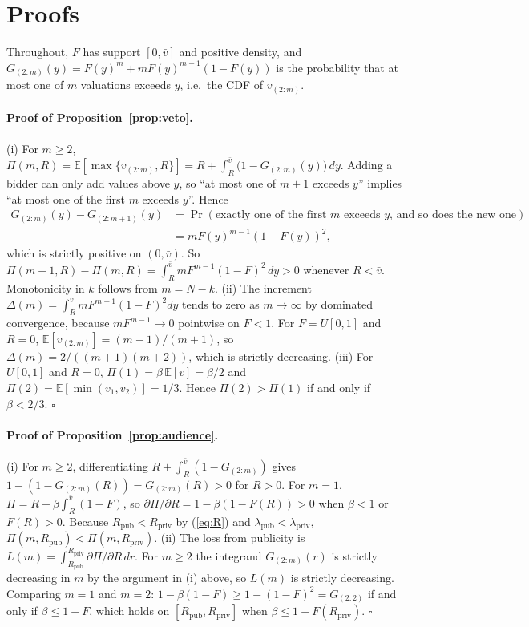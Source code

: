 \appendix
\section{Proofs}\label{app:proofs}

Throughout, $F$ has support $[0,\bar v]$ and positive density, and $G_{(2:m)}(y)=F(y)^m+mF(y)^{m-1}(1-F(y))$ is the probability that at most one of $m$ valuations exceeds $y$, i.e.\ the CDF of $v_{(2:m)}$.

\paragraph{Proof of Proposition~\ref{prop:veto}.} (i) For $m\ge2$, $\Pi(m,R)=\mathbb{E}[\max\{v_{(2:m)},R\}]=R+\int_R^{\bar v}\big(1-G_{(2:m)}(y)\big)\,dy$. Adding a bidder can only add values above $y$, so ``at most one of $m+1$ exceeds $y$'' implies ``at most one of the first $m$ exceeds $y$''. Hence
\begin{align*}
G_{(2:m)}(y)-G_{(2:m+1)}(y)&=\Pr(\text{exactly one of the first $m$ exceeds $y$, and so does the new one})\\
&= mF(y)^{m-1}(1-F(y))^2 ,
\end{align*}
which is strictly positive on $(0,\bar v)$. So $\Pi(m+1,R)-\Pi(m,R)=\int_R^{\bar v}mF^{m-1}(1-F)^2\,dy>0$ whenever $R<\bar v$. Monotonicity in $k$ follows from $m=N-k$.
(ii) The increment $\Delta(m)=\int_R^{\bar v}mF^{m-1}(1-F)^2dy$ tends to zero as $m\to\infty$ by dominated convergence, because $mF^{m-1}\to0$ pointwise on $F<1$. For $F=U[0,1]$ and $R=0$, $\mathbb{E}[v_{(2:m)}]=(m-1)/(m+1)$, so $\Delta(m)=2/((m+1)(m+2))$, which is strictly decreasing.
(iii) For $U[0,1]$ and $R=0$, $\Pi(1)=\beta\,\mathbb{E}[v]=\beta/2$ and $\Pi(2)=\mathbb{E}[\min(v_1,v_2)]=1/3$. Hence $\Pi(2)>\Pi(1)$ if and only if $\beta<2/3$. $\square$

\paragraph{Proof of Proposition~\ref{prop:audience}.} (i) For $m\ge2$, differentiating $R+\int_R^{\bar v}(1-G_{(2:m)})$ gives $1-(1-G_{(2:m)}(R))=G_{(2:m)}(R)>0$ for $R>0$. For $m=1$, $\Pi=R+\beta\int_R^{\bar v}(1-F)$, so $\partial\Pi/\partial R=1-\beta(1-F(R))>0$ when $\beta<1$ or $F(R)>0$. Because $R_{\text{pub}}<R_{\text{priv}}$ by (\ref{eq:R}) and $\lambda_{\text{pub}}<\lambda_{\text{priv}}$, $\Pi(m,R_{\text{pub}})<\Pi(m,R_{\text{priv}})$.
(ii) The loss from publicity is $L(m)=\int_{R_{\text{pub}}}^{R_{\text{priv}}}\partial\Pi/\partial R\,dr$. For $m\ge2$ the integrand $G_{(2:m)}(r)$ is strictly decreasing in $m$ by the argument in (i) above, so $L(m)$ is strictly decreasing. Comparing $m=1$ and $m=2$: $1-\beta(1-F)\ge 1-(1-F)^2=G_{(2:2)}$ if and only if $\beta\le 1-F$, which holds on $[R_{\text{pub}},R_{\text{priv}}]$ when $\beta\le 1-F(R_{\text{priv}})$. $\square$

